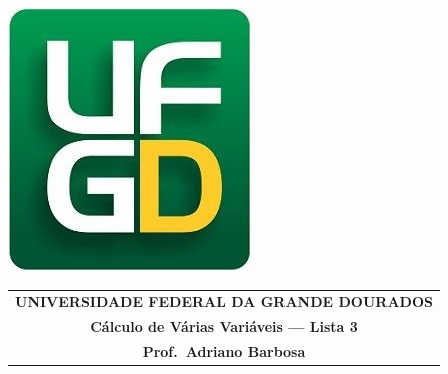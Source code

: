 \documentclass[a4paper,5pt]{amsbook}
\begin{document}
\thispagestyle{empty}
\pagestyle{empty}
\begin{minipage}[h]{0.14\textwidth}
	\includegraphics[scale=0.24]{../../ufgd.png}
\end{minipage}
\begin{minipage}[h]{\textwidth}
\begin{tabular}{c}
{{\bf UNIVERSIDADE FEDERAL DA GRANDE DOURADOS}}\\
{{\bf C\'alculo de V\'arias Vari\'aveis --- Lista 3}}\\
{{\bf Prof.\ Adriano Barbosa}}\\
\end{tabular}
\vspace{-0.45cm}
%
\end{minipage}

\end{document}
